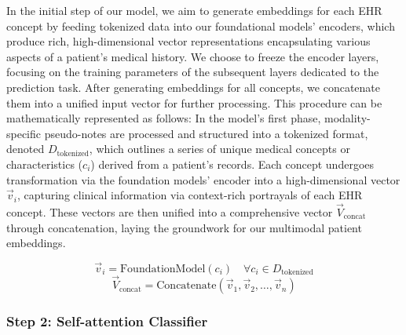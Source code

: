 \documentclass[pmlr]{jmlr}%
\begin{document}
In the initial step of our model, we aim to generate embeddings for each EHR concept by feeding tokenized data into our foundational models' encoders, which produce rich, high-dimensional vector representations encapsulating various aspects of a patient's medical history. We choose to freeze the encoder layers, focusing on the training parameters of the subsequent layers dedicated to the prediction task. After generating embeddings for all concepts, we concatenate them into a unified input vector for further processing. This procedure can be mathematically represented as follows: In the model's first phase, modality-specific pseudo-notes are processed and structured into a tokenized format, denoted $D_{\text{tokenized}}$, which outlines a series of unique medical concepts or characteristics ($c_i$) derived from a patient's records. Each concept undergoes transformation via the foundation models' encoder into a high-dimensional vector $\vec{v}_i$, capturing clinical information via context-rich portrayals of each EHR concept. These vectors are then unified into a comprehensive vector $\vec{V}_{\text{concat}}$ through concatenation, laying the groundwork for our multimodal patient embeddings.

\begin{equation}
    \vec{v}_i = \text{FoundationModel}(c_i) \quad \forall c_i \in D_{\text{tokenized}}
\end{equation}
\begin{equation}
    \vec{V}_{\text{concat}} = \text{Concatenate}(\vec{v}_1, \vec{v}_2, \ldots, \vec{v}_n)
\end{equation}

\subsubsection{Step 2: Self-attention Classifier}
\end{document}
